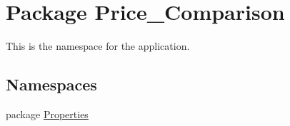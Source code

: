 \hypertarget{namespace_price___comparison}{\section{Package Price\-\_\-\-Comparison}
\label{namespace_price___comparison}
}


This is the namespace for the application.  


\subsection*{Namespaces}
\begin{DoxyCompactItemize}
\item 
package \hyperlink{namespace_price___comparison_1_1_properties}{Properties}
\end{DoxyCompactItemize}
